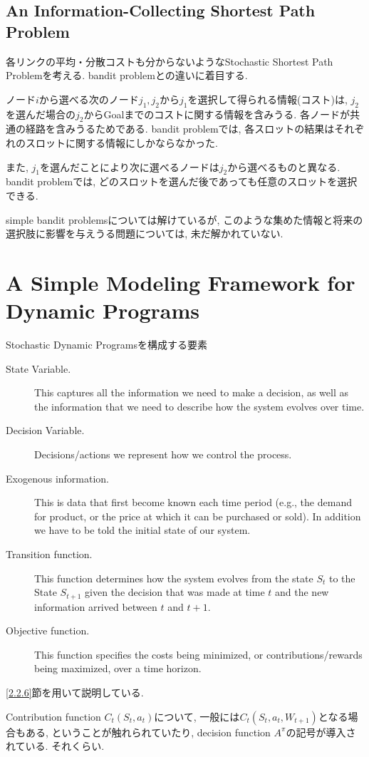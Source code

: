 \documentclass[11pt]{jsbook}
\begin{document}
\subsection{An Information-Collecting Shortest Path Problem}
各リンクの平均・分散コストも分からないようなStochastic Shortest Path Problemを考える.
bandit problemとの違いに着目する.

ノード$i$から選べる次のノード$j_1,j_2$から$j_1$を選択して得られる情報(コスト)は,
$j_2$を選んだ場合の$j_2$からGoalまでのコストに関する情報を含みうる.
各ノードが共通の経路を含みうるためである.
bandit problemでは, 各スロットの結果はそれぞれのスロットに関する情報にしかならなかった.

また, $j_1$を選んだことにより次に選べるノードは$j_2$から選べるものと異なる.
bandit problemでは, どのスロットを選んだ後であっても任意のスロットを選択できる.

simple bandit problemsについては解けているが,
このような集めた情報と将来の選択肢に影響を与えうる問題については, 未だ解かれていない.

\section{A Simple Modeling Framework for Dynamic Programs}
Stochastic Dynamic Programsを構成する要素
\begin{description}
	\item[State Variable.] This captures all the information we need to make a decision, 
	as well as the information that we need to describe how the system evolves over time.
	\item[Decision Variable.] Decisions/actions we represent how we control the process.
	\item[Exogenous information.] This is data that first become known each time period
	(e.g., the demand for product, or the price at which it can be purchased or sold).
	In addition we have to be told the initial state of our system.
	\item[Transition function.] This function determines how the system evolves from the 
	state $S_t$ to the State $S_{t+1}$ given the decision that was made at time $t$ and 
	the new information arrived between $t$ and $t+1$.
	\item[Objective function.] This function specifies the costs being minimized,
	 or contributions/rewards being maximized, over a time horizon.
\end{description}
\ref{2.2.6}節を用いて説明している. 

Contribution function $C_t(S_t, a_t)$について, 一般には$C_t(S_t, a_t, W_{t+1})$となる場合もある,
ということが触れられていたり, decision function $A^{\pi}$の記号が導入されている.
それくらい.
\end{document}
